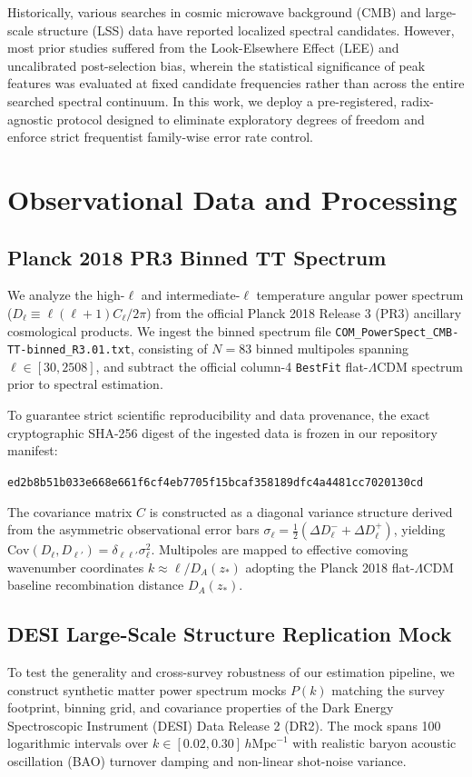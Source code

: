 \documentclass[10pt,twocolumn,a4paper]{article}
\begin{document}
Historically, various searches in cosmic microwave background (CMB) and large-scale structure (LSS) data have reported localized spectral candidates. However, most prior studies suffered from the Look-Elsewhere Effect (LEE) and uncalibrated post-selection bias, wherein the statistical significance of peak features was evaluated at fixed candidate frequencies rather than across the entire searched spectral continuum. In this work, we deploy a pre-registered, radix-agnostic protocol designed to eliminate exploratory degrees of freedom and enforce strict frequentist family-wise error rate control.

\section{Observational Data and Processing}
\subsection{Planck 2018 PR3 Binned TT Spectrum}
We analyze the high-$\ell$ and intermediate-$\ell$ temperature angular power spectrum ($D_\ell \equiv \ell(\ell+1)C_\ell/2\pi$) from the official Planck 2018 Release 3 (PR3) ancillary cosmological products. We ingest the binned spectrum file \texttt{COM\_PowerSpect\_CMB-TT-binned\_R3.01.txt}, consisting of $N = 83$ binned multipoles spanning $\ell \in [30, 2508]$, and subtract the official column-4 \texttt{BestFit} flat-$\Lambda$CDM spectrum prior to spectral estimation. 

To guarantee strict scientific reproducibility and data provenance, the exact cryptographic SHA-256 digest of the ingested data is frozen in our repository manifest:
\begin{center}
\texttt{ed2b8b51b033e668e661f6cf4eb7705f15bcaf358189dfc4a4481cc7020130cd}
\end{center}
The covariance matrix $C$ is constructed as a diagonal variance structure derived from the asymmetric observational error bars $\sigma_\ell = \frac{1}{2}(\Delta D_\ell^- + \Delta D_\ell^+)$, yielding $\mathrm{Cov}(D_\ell, D_{\ell'}) = \delta_{\ell \ell'} \sigma_\ell^2$. Multipoles are mapped to effective comoving wavenumber coordinates $k \approx \ell / D_A(z_*)$ adopting the Planck 2018 flat-$\Lambda$CDM baseline recombination distance $D_A(z_*)$.

\subsection{DESI Large-Scale Structure Replication Mock}
To test the generality and cross-survey robustness of our estimation pipeline, we construct synthetic matter power spectrum mocks $P(k)$ matching the survey footprint, binning grid, and covariance properties of the Dark Energy Spectroscopic Instrument (DESI) Data Release 2 (DR2). The mock spans 100 logarithmic intervals over $k \in [0.02, 0.30]\,h\mathrm{Mpc}^{-1}$ with realistic baryon acoustic oscillation (BAO) turnover damping and non-linear shot-noise variance.
\end{document}
